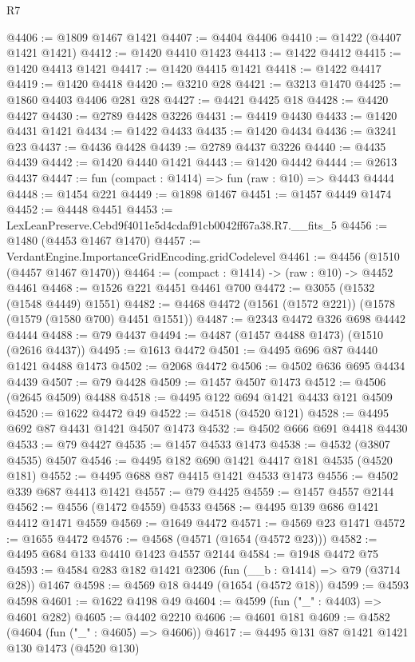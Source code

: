 \begin{lexlean}{R7}
\begin{coremodule}
@4406 := @1809 @1467 @1421
@4407 := @4404 @4406
@4410 := @1422 (@4407 @1421 @1421)
@4412 := @1420 @4410 @1423
@4413 := @1422 @4412
@4415 := @1420 @4413 @1421
@4417 := @1420 @4415 @1421
@4418 := @1422 @4417
@4419 := @1420 @4418
@4420 := @3210 @28
@4421 := @3213 @1470
@4425 := @1860 @4403 @4406 @281 @28
@4427 := @4421 @4425 @18
@4428 := @4420 @4427
@4430 := @2789 @4428 @3226
@4431 := @4419 @4430
@4433 := @1420 @4431 @1421
@4434 := @1422 @4433
@4435 := @1420 @4434
@4436 := @3241 @23
@4437 := @4436 @4428
@4439 := @2789 @4437 @3226
@4440 := @4435 @4439
@4442 := @1420 @4440 @1421
@4443 := @1420 @4442
@4444 := @2613 @4437
@4447 := fun (compact : @1414) => fun (raw : @10) => @4443 @4444
@4448 := @1454 @221
@4449 := @1898 @1467
@4451 := @1457 @4449 @1474
@4452 := @4448 @4451
@4453 := LexLeanPreserve.Cebd9f4011e5d4cdaf91cb0042ff67a38.R7.__fits_5
@4456 := @1480 (@4453 @1467 @1470)
@4457 := VerdantEngine.ImportanceGridEncoding.gridCodelevel
@4461 := @4456 (@1510 (@4457 @1467 @1470))
@4464 := (compact : @1414) -> (raw : @10) -> @4452 @4461
@4468 := @1526 @221 @4451 @4461 @700
@4472 := @3055 (@1532 (@1548 @4449) @1551)
@4482 := @4468 @4472 (@1561 (@1572 @221)) (@1578 (@1579 (@1580 @700) @4451 @1551))
@4487 := @2343 @4472 @326 @698 @4442 @4444
@4488 := @79 @4437
@4494 := @4487 (@1457 @4488 @1473) (@1510 (@2616 @4437))
@4495 := @1613 @4472
@4501 := @4495 @696 @87 @4440 @1421 @4488 @1473
@4502 := @2068 @4472
@4506 := @4502 @636 @695 @4434 @4439
@4507 := @79 @4428
@4509 := @1457 @4507 @1473
@4512 := @4506 (@2645 @4509) @4488
@4518 := @4495 @122 @694 @1421 @4433 @121 @4509
@4520 := @1622 @4472 @49
@4522 := @4518 (@4520 @121)
@4528 := @4495 @692 @87 @4431 @1421 @4507 @1473
@4532 := @4502 @666 @691 @4418 @4430
@4533 := @79 @4427
@4535 := @1457 @4533 @1473
@4538 := @4532 (@3807 @4535) @4507
@4546 := @4495 @182 @690 @1421 @4417 @181 @4535 (@4520 @181)
@4552 := @4495 @688 @87 @4415 @1421 @4533 @1473
@4556 := @4502 @339 @687 @4413 @1421
@4557 := @79 @4425
@4559 := @1457 @4557 @2144
@4562 := @4556 (@1472 @4559) @4533
@4568 := @4495 @139 @686 @1421 @4412 @1471 @4559
@4569 := @1649 @4472
@4571 := @4569 @23 @1471
@4572 := @1655 @4472
@4576 := @4568 (@4571 (@1654 (@4572 @23)))
@4582 := @4495 @684 @133 @4410 @1423 @4557 @2144
@4584 := @1948 @4472 @75
@4593 := @4584 @283 @182 @1421 @2306 (fun (__b : @1414) => @79 (@3714 @28)) @1467
@4598 := @4569 @18 @4449 (@1654 (@4572 @18))
@4599 := @4593 @4598
@4601 := @1622 @4198 @49
@4604 := @4599 (fun ("_" : @4403) => @4601 @282)
@4605 := @4402 @2210
@4606 := @4601 @181
@4609 := @4582 (@4604 (fun ("_" : @4605) => @4606))
@4617 := @4495 @131 @87 @1421 @1421 @130 @1473 (@4520 @130)

\end{coremodule}
\end{lexlean}
